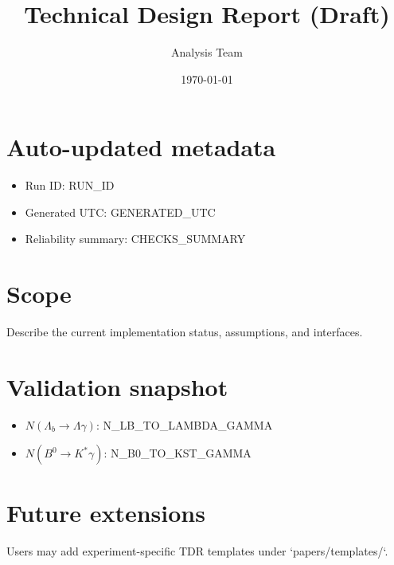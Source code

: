 \documentclass[11pt,a4paper]{article}
\title{Technical Design Report (Draft)}
\author{Analysis Team}
\date{\today}
\begin{document}
\maketitle

\section*{Auto-updated metadata}
\begin{itemize}
  \item Run ID: {{RUN_ID}}
  \item Generated UTC: {{GENERATED_UTC}}
  \item Reliability summary: {{CHECKS_SUMMARY}}
\end{itemize}

\section{Scope}
Describe the current implementation status, assumptions, and interfaces.

\section{Validation snapshot}
\begin{itemize}
  \item $N(\Lambda_b \rightarrow \Lambda \gamma)$: {{N_LB_TO_LAMBDA_GAMMA}}
  \item $N(B^0 \rightarrow K^{*}\gamma)$: {{N_B0_TO_KST_GAMMA}}
\end{itemize}

\section{Future extensions}
Users may add experiment-specific TDR templates under `papers/templates/`.
\end{document}
